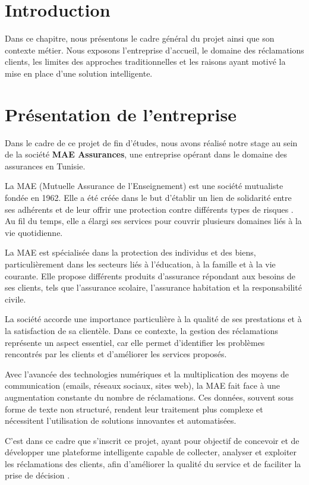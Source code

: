 \documentclass[12pt,a4paper,oneside]{report}
\begin{document}
\section{Introduction}
Dans ce chapitre, nous présentons le cadre général du projet ainsi que son contexte métier. Nous exposons l’entreprise d’accueil, le domaine des réclamations clients, les limites des approches traditionnelles et les raisons ayant motivé la mise en place d’une solution intelligente.

\section{Présentation de l’entreprise}

Dans le cadre de ce projet de fin d’études, nous avons réalisé notre stage au sein de la société \textbf{MAE Assurances}, une entreprise opérant dans le domaine des assurances en Tunisie.

La MAE (Mutuelle Assurance de l’Enseignement) est une société mutualiste fondée en 1962. Elle a été créée dans le but d’établir un lien de solidarité entre ses adhérents et de leur offrir une protection contre différents types de risques \cite{mae}. Au fil du temps, elle a élargi ses services pour couvrir plusieurs domaines liés à la vie quotidienne.

La MAE est spécialisée dans la protection des individus et des biens, particulièrement dans les secteurs liés à l'éducation, à la famille et à la vie courante. Elle propose différents produits d'assurance répondant aux besoins de ses clients, tels que l'assurance scolaire, l'assurance habitation et la responsabilité civile.

La société accorde une importance particulière à la qualité de ses prestations et à la satisfaction de sa clientèle. Dans ce contexte, la gestion des réclamations représente un aspect essentiel, car elle permet d’identifier les problèmes rencontrés par les clients et d’améliorer les services proposés.

Avec l’avancée des technologies numériques et la multiplication des moyens de communication (emails, réseaux sociaux, sites web), la MAE fait face à une augmentation constante du nombre de réclamations. Ces données, souvent sous forme de texte non structuré, rendent leur traitement plus complexe et nécessitent l’utilisation de solutions innovantes et automatisées.

C’est dans ce cadre que s’inscrit ce projet, ayant pour objectif de concevoir et de développer une plateforme intelligente capable de collecter, analyser et exploiter les réclamations des clients, afin d’améliorer la qualité du service et de faciliter la prise de décision \cite{mae}.
\end{document}

